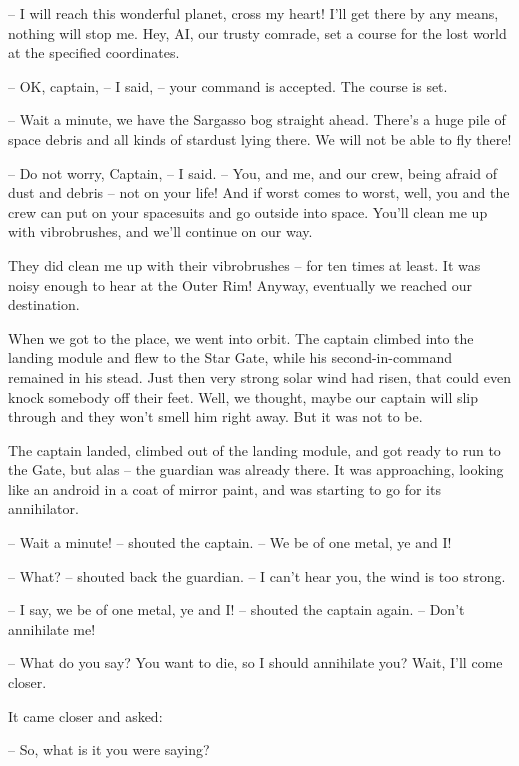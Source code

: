 \documentclass[ebook,oneside,final,openright]{memoir}
\begin{document}
– I will reach this wonderful planet, cross my heart! I’ll get there by any means, nothing will stop me. Hey, AI, our trusty comrade, set a course for the lost world at the specified coordinates.\par
– OK, captain, – I said, – your command is accepted. The course is set.\par
– Wait a minute, we have the Sargasso bog straight ahead. There’s a huge pile of space debris and all kinds of stardust lying there. We will not be able to fly there!\par
– Do not worry, Captain, – I said. – You, and me, and our crew, being afraid of dust and debris – not on your life! And if worst comes to worst, well, you and the crew can put on your spacesuits and go outside into space. You’ll clean me up with vibrobrushes, and we’ll continue on our way.\par
\par
They did clean me up with their vibrobrushes – for ten times at least. It was noisy enough to hear at the Outer Rim! Anyway, eventually we reached our destination.\par
\par
When we got to the place, we went into orbit. The captain climbed into the landing module and flew to the Star Gate, while his second-in-command remained in his stead. Just then very strong solar wind had risen, that could even knock somebody off their feet. Well, we thought, maybe our captain will slip through and they won’t smell him right away. But it was not to be.\par
\par
The captain landed, climbed out of the landing module, and got ready to run to the Gate, but alas – the guardian was already there. It was approaching, looking like an android in a coat of mirror paint, and was starting to go for its annihilator.\par
– Wait a minute! – shouted the captain. – We be of one metal, ye and I!\par
– What? – shouted back the guardian. – I can’t hear you, the wind is too strong.\par
– I say, we be of one metal, ye and I! – shouted the captain again. – Don’t annihilate me!\par
– What do you say? You want to die, so I should annihilate you? Wait, I’ll come closer.\par
\par
It came closer and asked:\par
– So, what is it you were saying?\par
\end{document}
